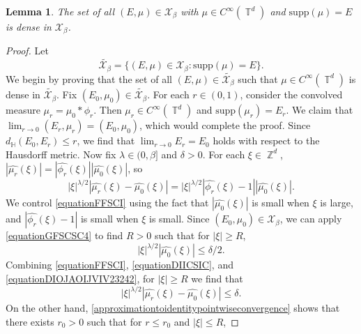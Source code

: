 \documentclass[dvipsnames,letterpaper,12pt]{article}
\numberwithin{equation}{section}
\DeclareMathOperator{\ZZ}{\mathbb{Z}}
\DeclareMathOperator{\TT}{\mathbb{T}}
\newtheorem{lemma}[theorem]{Lemma}
\numberwithin{theorem}{section}
\begin{document}
\begin{lemma} \label{smoothdensitylemma}
    The set of all $(E,\mu) \in \mathcal{X}_\beta$ with $\mu \in C^\infty(\TT^d)$ and $\text{supp}(\mu) = E$ is dense in $\mathcal{X}_\beta$.
\end{lemma}
\begin{proof}
    Let 
    \begin{equation}
        \tilde{\mathcal{X}_\beta} = \{ (E,\mu) \in \mathcal{X}_\beta : \text{supp}(\mu) = E \}.
    \end{equation}
    We begin by proving that the set of all $(E,\mu) \in \tilde{\mathcal{X}_\beta}$ such that $\mu \in C^\infty(\TT^d)$ is dense in $\tilde{\mathcal{X}_\beta}$. Fix $(E_0,\mu_0) \in \tilde{\mathcal{X}_\beta}$. For each $r \in (0,1)$, consider the convolved measure $\mu_r = \mu_0 * \phi_r$. Then $\mu_r \in C^\infty(\TT^d)$ and $\text{supp}(\mu_r) = E_r$. We claim that $\lim_{r \to 0} (E_r,\mu_r) = (E_0,\mu_0)$, which would complete the proof. Since $d_{\mathbb{H}}(E_0,E_r) \leq r$, we find that $\lim_{r \to 0} E_r = E_0$ holds with respect to the Hausdorff metric. Now fix $\lambda \in (0,\beta]$ and $\delta > 0$. For each $\xi \in \ZZ^d$, $|\widehat{\mu_r}(\xi)| = |\widehat{\phi_r}(\xi)| |\widehat{\mu_0}(\xi)|$, so
    \begin{equation} \label{equationFFSCI}
        |\xi|^{\lambda/2} |\widehat{\mu_r}(\xi) - \widehat{\mu_0}(\xi)| = |\xi|^{\lambda/2} |\widehat{\phi_r}(\xi) - 1| |\widehat{\mu_0}(\xi)|.
    \end{equation}
    We control \eqref{equationFFSCI} using the fact that $|\widehat{\mu_0}(\xi)|$ is small when $\xi$ is large, and $|\widehat{\phi_r}(\xi) - 1|$ is small when $\xi$ is small. Since $(E_0,\mu_0) \in \mathcal{X}_\beta$, we can apply \eqref{equationGFSCSC4} to find $R > 0$ such that for $|\xi| \geq R$,
    \begin{equation} \label{equationDIICSIC}
        |\xi|^{\lambda/2} |\widehat{\mu_0}(\xi)| \leq \delta/2.
    \end{equation}
    Combining \eqref{equationFFSCI}, \eqref{equationDIICSIC}, and \eqref{equationDIOJAOIJVIV23242}, for $|\xi| \geq R$ we find that
    \begin{equation} \label{equationDSCISIIXX}
        |\xi|^{\lambda/2} |\widehat{\mu_r}(\xi) - \widehat{\mu_0}(\xi)| \leq \delta.
    \end{equation}
    On the other hand, \eqref{approximationtoidentitypointwiseconvergence} shows that there exists $r_0 > 0$ such that for $r \leq r_0$ and $|\xi| \leq R$,

\end{proof}
\end{document}
